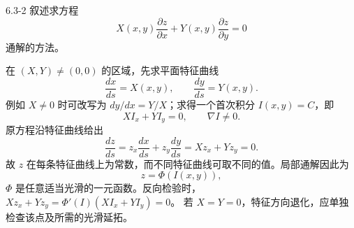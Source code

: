 \documentclass[UTF8,a4paper,11pt]{ctexart}
\begin{document}
\begin{problem}{6.3-2}
叙述求方程
\[
X(x,y)\frac{\partial z}{\partial x}
+Y(x,y)\frac{\partial z}{\partial y}=0
\]
通解的方法。
\end{problem}
\begin{solution}
在 $(X,Y)\ne(0,0)$ 的区域，先求平面特征曲线
\[
\frac{dx}{ds}=X(x,y),\qquad
\frac{dy}{ds}=Y(x,y).
\]
例如 $X\ne0$ 时可改写为 $dy/dx=Y/X$；求得一个首次积分
$I(x,y)=C$，即
\[
X I_x+Y I_y=0,\qquad \nabla I\ne0.
\]
原方程沿特征曲线给出
\[
\frac{dz}{ds}
=z_x\frac{dx}{ds}+z_y\frac{dy}{ds}
=Xz_x+Yz_y=0.
\]
故 $z$ 在每条特征曲线上为常数，而不同特征曲线可取不同的值。局部通解因此为
\[
\boxed{z=\Phi(I(x,y)),}
\]
$\Phi$ 是任意适当光滑的一元函数。反向检验时，
$Xz_x+Yz_y=\Phi'(I)(XI_x+YI_y)=0$。
若 $X=Y=0$，特征方向退化，应单独检查该点及所需的光滑延拓。
\end{solution}
\end{document}

